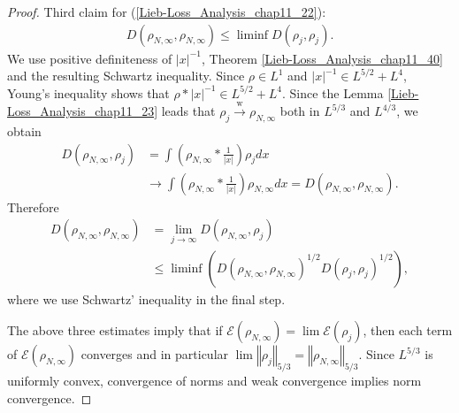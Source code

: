 \documentclass[openany, a4paper, oneside]{jsbook}
\theoremstyle{break}
\theoremstyle{breakdefn}
\newcommand{\abs}[1]{\left|#1\right|}
\newcommand{\norm}[1]{\left\Vert#1\right\Vert}
\newcommand{\rbk}[1]{\left (#1\right)}
\newcommand{\calE}{\mathcal{E}}
\newcommand{\limjtoinfty}{\lim_{j \to \infty}}
\newcommand{\rhoNinfty}{\rho_{N, \infty}}
\newcommand{\wto}{\xrightarrow{\text{w}}}
\begin{document}
\begin{proof}
Third claim for (\ref{Lieb-Loss_Analysis_chap11_22}):
\begin{align}
 D (\rhoNinfty, \rhoNinfty)
 \leq
 \liminf D \rbk{\rho_j, \rho_j}.
\end{align}
We use positive definiteness of $\abs{x}^{-1}$, Theorem \ref{Lieb-Loss_Analysis_chap11_40} and the resulting Schwartz inequality.
Since $\rho \in L^1$ and $\abs{x}^{-1} \in L^{5/2} + L^4$, Young's inequality shows that $\rho * \abs{x}^{-1} \in L^{5/2} + L^4$.
Since the Lemma \ref{Lieb-Loss_Analysis_chap11_23} leads that $\rho_j \wto \rhoNinfty$ both in $L^{5/3}$ and $L^{4/3}$,
we obtain
\begin{align}
 D (\rhoNinfty, \rho_j)
 &=
 \int \rbk{\rhoNinfty * \frac{1}{\abs{x}}} \rho_j dx \\
 &\to
 \int \rbk{\rhoNinfty * \frac{1}{\abs{x}}} \rhoNinfty dx
 =
 D (\rhoNinfty, \rhoNinfty).
\end{align}
Therefore
\begin{align}
 D \rbk{\rhoNinfty, \rhoNinfty}
 &=
 \limjtoinfty D \rbk{\rhoNinfty, \rho_j} \\
 &\leq
 \liminf \rbk{D\rbk{\rhoNinfty, \rhoNinfty}^{1/2} D \rbk{\rho_j, \rho_j}^{1/2}},
\end{align}
where we use Schwartz' inequality in the final step.

The above three estimates imply that if $\calE (\rhoNinfty) = \lim \calE (\rho_j)$, then each term of $\calE (\rhoNinfty)$
converges and in particular $\lim \norm{\rho_j}_{5/3} = \norm{\rhoNinfty}_{5/3}$.
Since $L^{5/3}$ is uniformly convex, convergence of norms and weak convergence implies norm convergence.
\end{proof}
\end{document}
